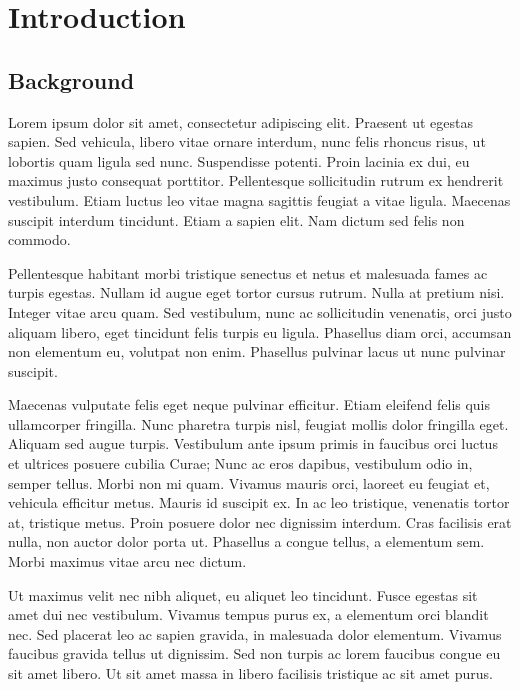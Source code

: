 \documentclass[runningheads,a4paper]{llncs}
\begin{document}
%
%
\section{Introduction}
\subsection{Background}
Lorem ipsum dolor sit amet, consectetur adipiscing elit. Praesent ut egestas sapien. Sed vehicula, libero vitae ornare interdum, nunc felis rhoncus risus, ut lobortis quam ligula sed nunc. Suspendisse potenti. Proin lacinia ex dui, eu maximus justo consequat porttitor. Pellentesque sollicitudin rutrum ex hendrerit vestibulum. Etiam luctus leo vitae magna sagittis feugiat a vitae ligula. Maecenas suscipit interdum tincidunt. Etiam a sapien elit. Nam dictum sed felis non commodo.

Pellentesque habitant morbi tristique senectus et netus et malesuada fames ac turpis egestas. Nullam id augue eget tortor cursus rutrum. Nulla at pretium nisi. Integer vitae arcu quam. Sed vestibulum, nunc ac sollicitudin venenatis, orci justo aliquam libero, eget tincidunt felis turpis eu ligula. Phasellus diam orci, accumsan non elementum eu, volutpat non enim. Phasellus pulvinar lacus ut nunc pulvinar suscipit.

Maecenas vulputate felis eget neque pulvinar efficitur. Etiam eleifend felis quis ullamcorper fringilla. Nunc pharetra turpis nisl, feugiat mollis dolor fringilla eget. Aliquam sed augue turpis. Vestibulum ante ipsum primis in faucibus orci luctus et ultrices posuere cubilia Curae; Nunc ac eros dapibus, vestibulum odio in, semper tellus. Morbi non mi quam. Vivamus mauris orci, laoreet eu feugiat et, vehicula efficitur metus. Mauris id suscipit ex. In ac leo tristique, venenatis tortor at, tristique metus. Proin posuere dolor nec dignissim interdum. Cras facilisis erat nulla, non auctor dolor porta ut. Phasellus a congue tellus, a elementum sem. Morbi maximus vitae arcu nec dictum.

Ut maximus velit nec nibh aliquet, eu aliquet leo tincidunt. Fusce egestas sit amet dui nec vestibulum. Vivamus tempus purus ex, a elementum orci blandit nec. Sed placerat leo ac sapien gravida, in malesuada dolor elementum. Vivamus faucibus gravida tellus ut dignissim. Sed non turpis ac lorem faucibus congue eu sit amet libero. Ut sit amet massa in libero facilisis tristique ac sit amet purus.
\end{document}
